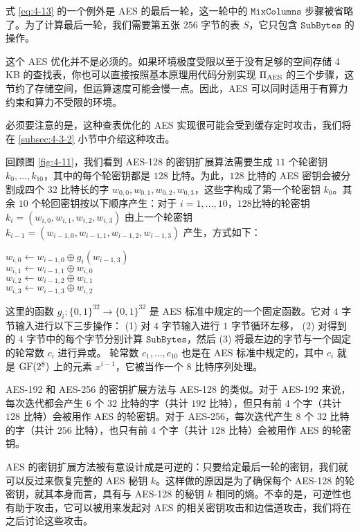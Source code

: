 \begin{snote}
式 \ref{eq:4-13} 的一个例外是 AES 的最后一轮，这一轮中的 $\mathtt{MixColumns}$ 步骤被省略了。为了计算最后一轮，我们需要第五张 $256$ 字节的表 $S$，它只包含 $\mathtt{SubBytes}$ 的操作。

这个 AES 优化并不是必须的。如果环境极度受限以至于没有足够的空间存储 4 KB 的查找表，你也可以直接按照基本原理用代码分别实现 $\Pi_{\rm AES}$ 的三个步骤，这节约了存储空间，但运算速度可能会慢一点。因此，AES 可以同时适用于有算力约束和算力不受限的环境。

必须要注意的是，这种查表优化的 AES 实现很可能会受到缓存定时攻击，我们将在 \ref{subsec:4-3-2} 小节中介绍这种攻击。
\end{snote}


\begin{snote}
回顾图 \ref{fig:4-11}，我们看到 AES-128 的密钥扩展算法需要生成 $11$ 个轮密钥 $k_0,\dots,k_{10}$，其中的每个轮密钥都是 $128$ 比特。为此，$128$ 比特的 AES 密钥会被分割成四个 $32$ 比特长的字 $w_{0,0},w_{0,1},w_{0,2},w_{0,3}$，这些字构成了第一个轮密钥 $k_0$。其余 $10$ 个轮回密钥按以下顺序产生：对于 $i=1,\dots,10$，$128$比特的轮密钥 $k_i=(w_{i,0},w_{i,1},w_{i,2},w_{i,3})$ 由上一个轮密钥 $k_{i-1}=(w_{i-1,0},w_{i-1,1},w_{i-1,2},w_{i-1,3})$ 产生，方式如下：
 
\vspace*{10pt}

\hspace*{5pt} $w_{i,0}\leftarrow w_{i-1,0}\oplus g_i(w_{i-1,3})$\\
\hspace*{26pt} $w_{i,1}\leftarrow w_{i-1,1}\oplus w_{i,0}$\\
\hspace*{26pt} $w_{i,2}\leftarrow w_{i-1,2}\oplus w_{i,1}$\\
\hspace*{26pt} $w_{i,3}\leftarrow w_{i-1,3}\oplus w_{i,2}$

\vspace*{10pt}

\noindent
这里的函数 $g_i:\{0,1\}^{32}\to\{0,1\}^{32}$ 是 AES 标准中规定的一个固定函数。它对 $4$ 字节输入进行以下三步操作：
(1) 对 $4$ 字节输入进行 $1$ 字节循环左移，
(2) 对得到的 $4$ 字节中的每个字节分别计算 $\mathtt{SubBytes}$，然后
(3) 将最左边的字节与一个固定的轮常数 $c_i$ 进行异或。
轮常数 $c_1,\dots,c_{10}$ 也是在 AES 标准中规定的，其中 $c_i$ 就是 ${\rm GF}(2^8)$ 上的元素 $x^{i-1}$，它被当作一个 $8$ 比特序列处理。

AES-192 和 AES-256 的密钥扩展方法与 AES-128 的类似。对于 AES-192 来说，每次迭代都会产生 $6$ 个 $32$ 比特的字（共计 $192$ 比特），但只有前 $4$ 个字（共计 $128$ 比特）会被用作 AES 的轮密钥。对于 AES-256，每次迭代产生 $8$ 个 $32$ 比特的字（共计 $256$ 比特），也只有前 $4$ 个字（共计 $128$ 比特）会被用作 AES 的轮密钥。

AES 的密钥扩展方法被有意设计成是可逆的：只要给定最后一轮的密钥，我们就可以反过来恢复完整的 AES 秘钥 $k$。这样做的原因是为了确保每个 AES-128 的轮密钥，就其本身而言，具有与 AES-128 的秘钥 $k$ 相同的熵。不幸的是，可逆性也有助于攻击，它可以被用来发起对 AES 的相关密钥攻击和边信道攻击，我们将在之后讨论这些攻击。
\end{snote}

